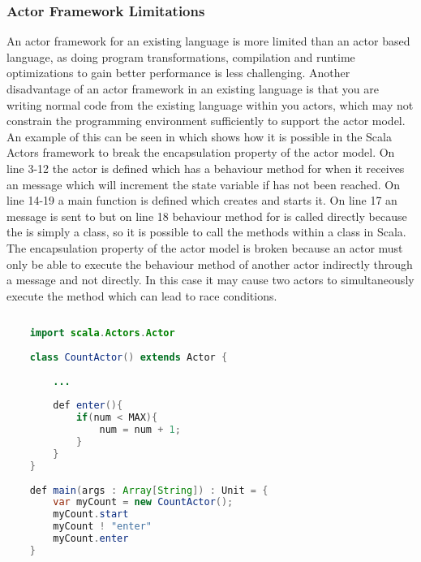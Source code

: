 \subsubsection{Actor Framework Limitations}
An actor framework for an existing language is more limited than an actor based language, as doing program transformations, compilation and runtime optimizations to gain better performance is less challenging\cite[p. 5]{karmani2011actors}. Another disadvantage of an actor framework in an existing language is that you are writing normal code from the existing language within you actors, which may not constrain the programming environment sufficiently to support the actor model. An example of this can be seen in  which shows how it is possible in the Scala Actors framework to break the encapsulation property of the actor model. On line 3-12 the  actor is defined which has a behaviour method for when it receives an  message which will increment the state variable  if  has not been reached. On line 14-19 a main function is defined which creates  and starts it. On line 17 an  message is sent to  but on line 18 behaviour method for  is called directly because the  is simply a class, so it is possible to call the methods within a class in Scala. The encapsulation property of the actor model is broken because an actor must only be able to execute the behaviour method of another actor indirectly through a message and not directly. In this case it may cause two actors to simultaneously execute the  method which can lead to race conditions. 

\begin{lstlisting}[label=lst:actor_state_encapsulation_violation,
  caption={Scala Actors violating state encapsulation},
  language=Java,  
  showspaces=false,
  showtabs=false,
  breaklines=true,
  showstringspaces=false,
  breakatwhitespace=true,
  commentstyle=\color{greencomments},
  keywordstyle=\color{bluekeywords},
  stringstyle=\color{redstrings}]  % Start your code-block
	
	import scala.Actors.Actor
	
	class CountActor() extends Actor {
				
		...
		
		def enter(){
			if(num < MAX){
				num = num + 1;
			}
		}
	}
	
	def main(args : Array[String]) : Unit = {
		var myCount = new CountActor();
		myCount.start
		myCount ! "enter"
		myCount.enter
	}
\end{lstlisting}

